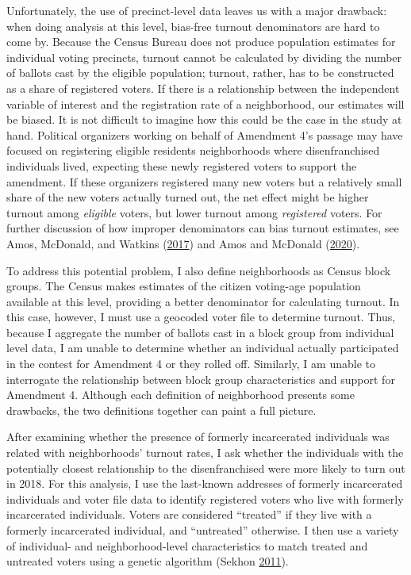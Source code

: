 \documentclass[
  12pt,
]{article}
\begin{document}
Unfortunately, the use of precinct-level data leaves us with a major drawback: when doing analysis at this level, bias-free turnout denominators are hard to come by. Because the Census Bureau does not produce population estimates for individual voting precincts, turnout cannot be calculated by dividing the number of ballots cast by the eligible population; turnout, rather, has to be constructed as a share of registered voters. If there is a relationship between the independent variable of interest and the registration rate of a neighborhood, our estimates will be biased. It is not difficult to imagine how this could be the case in the study at hand. Political organizers working on behalf of Amendment 4's passage may have focused on registering eligible residents neighborhoods where disenfranchised individuals lived, expecting these newly registered voters to support the amendment. If these organizers registered many new voters but a relatively small share of the new voters actually turned out, the net effect might be higher turnout among \emph{eligible} voters, but lower turnout among \emph{registered} voters. For further discussion of how improper denominators can bias turnout estimates, see Amos, McDonald, and Watkins (\protect\hyperlink{ref-Amos2017}{2017}) and Amos and McDonald (\protect\hyperlink{ref-Amos2020}{2020}).

To address this potential problem, I also define neighborhoods as Census block groups. The Census makes estimates of the citizen voting-age population available at this level, providing a better denominator for calculating turnout. In this case, however, I must use a geocoded voter file to determine turnout. Thus, because I aggregate the number of ballots cast in a block group from individual level data, I am unable to determine whether an individual actually participated in the contest for Amendment 4 or they rolled off. Similarly, I am unable to interrogate the relationship between block group characteristics and support for Amendment 4. Although each definition of neighborhood presents some drawbacks, the two definitions together can paint a full picture.

After examining whether the presence of formerly incarcerated individuals was related with neighborhoods' turnout rates, I ask whether the individuals with the potentially closest relationship to the disenfranchised were more likely to turn out in 2018. For this analysis, I use the last-known addresses of formerly incarcerated individuals and voter file data to identify registered voters who live with formerly incarcerated individuals. Voters are considered ``treated'' if they live with a formerly incarcerated individual, and ``untreated'' otherwise. I then use a variety of individual- and neighborhood-level characteristics to match treated and untreated voters using a genetic algorithm (Sekhon \protect\hyperlink{ref-Sekhon2011}{2011}).
\end{document}
